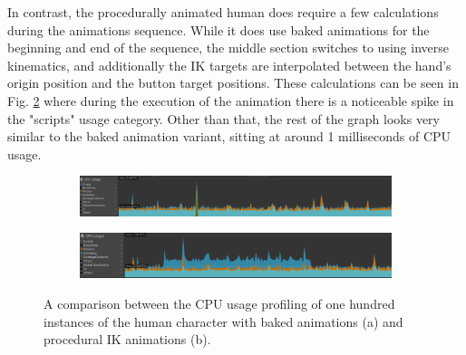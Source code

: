 In contrast, the procedurally animated human does require a few calculations
during the animations sequence. While it does use baked animations for the
beginning and end of the sequence, the middle section switches to using inverse
kinematics, and additionally the IK targets are interpolated between the hand's
origin position and the button target positions. These calculations can be
seen in Fig. \ref{fig:pr_h_ik} where during the execution of the animation
there is a noticeable spike in the "scripts" usage category. Other than that,
the rest of the graph looks very similar to the baked animation variant, sitting
at around 1 milliseconds of CPU usage.

\begin{figure}
    \centering
    \captionsetup{justification=centering}
    \begin{subfigure}{\textwidth}
        \centering
        \includegraphics[width=\linewidth]{grafika/pr_h_b.eps}
        \subcaption{}
        \label{fig:pr_h_b}
    \end{subfigure}
    \begin{subfigure}{\textwidth}
        \centering
        \includegraphics[width=\linewidth]{grafika/pr_h_ik.eps}
        \subcaption{}
        \label{fig:pr_h_ik}
    \end{subfigure}
    \caption{A comparison between the CPU usage profiling of one hundred
    instances of the human character with baked animations (a) and
    procedural IK animations (b).}
    \label{fig:pr_h}
\end{figure}

